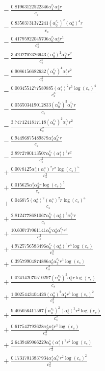 \documentclass[10pt]{article}
\begin{document}
\begin{align*}
&{}  - \frac{0.81963122522346 \alpha_{1}^{c_s} \alpha_{3}^s r}{c_{s}} \\
&{}  - \frac{0.83503731372241 \left(\alpha_{0}^{c_s}\right)^{2} \left(\alpha_{0}^s\right)^{4} r}{c_{s}} \\
&{}  - \frac{0.41795922045706 \alpha_{0}^{c_s} \alpha_{0}^s r^{5}}{c_{s}^{5}} \\
&{}  - \frac{3.4202702326943 \left(\alpha_{0}^s\right)^{2} \alpha_{2}^{c_s} r^{2}}{c_{s}^{2}} \\
&{}  - \frac{6.9086156682632 \left(\alpha_{0}^{c_s}\right)^{4} \alpha_{0}^s r^{2}}{c_{s}^{2}} \\
&{}  - \frac{0.0034551277589885 \left(\alpha_{1}^s\right)^{2} r^{3} \log{\left(c_{s} \right)}^{4}}{c_{s}^{3}} \\
&{}  - \frac{0.056503419012833 \left(\alpha_{0}^{c_s}\right)^{3} \alpha_{2}^{c_s} r}{c_{s}} \\
&{}  - \frac{3.7471241817118 \left(\alpha_{0}^{c_s}\right)^{2} \alpha_{2}^{c_s} r^{2}}{c_{s}^{2}} \\
&{}  - \frac{0.94496875489879 \alpha_{1}^s \alpha_{3}^{c_s} r}{c_{s}} \\
&{}  - \frac{3.8972700113507 \alpha_{0}^{c_s} \left(\alpha_{1}^s\right)^{2} r^{2}}{c_{s}^{2}} \\
&{}  + \frac{0.0078125 \alpha_{0}^s \left(\alpha_{1}^s\right)^{2} r^{2} \log{\left(c_{s} \right)}^{5}}{c_{s}^{2}} \\
&{}  + \frac{0.015625 \alpha_{1}^s \alpha_{3}^s r \log{\left(c_{s} \right)}^{5}}{c_{s}} \\
&{}  + \frac{0.046875 \left(\alpha_{0}^s\right)^{2} \left(\alpha_{1}^s\right)^{2} r \log{\left(c_{s} \right)}^{5}}{c_{s}} \\
&{}  + \frac{2.8124778681067 \alpha_{0}^{c_s} \left(\alpha_{0}^s\right)^{3} \alpha_{1}^{c_s} r}{c_{s}} \\
&{}  + \frac{10.600737061141 \alpha_{0}^{c_s} \alpha_{0}^s \alpha_{1}^{c_s} r^{3}}{c_{s}^{3}} \\
&{}  + \frac{4.9725756583496 \alpha_{0}^{c_s} \left(\alpha_{0}^s\right)^{3} r^{3} \log{\left(c_{s} \right)}}{c_{s}^{3}} \\
&{}  + \frac{0.39579904874886 \alpha_{0}^s \alpha_{2}^{c_s} r^{3} \log{\left(c_{s} \right)}}{c_{s}^{3}} \\
&{}  + \frac{0.024142070510297 \left(\alpha_{0}^{c_s}\right)^{5} \alpha_{0}^s r \log{\left(c_{s} \right)}}{c_{s}} \\
&{}  + \frac{1.0025443404426 \left(\alpha_{0}^s\right)^{2} \alpha_{1}^s r^{3} \log{\left(c_{s} \right)}^{2}}{c_{s}^{3}} \\
&{}  + \frac{9.405056411597 \left(\alpha_{0}^{c_s}\right)^{2} \left(\alpha_{0}^s\right)^{3} r^{2} \log{\left(c_{s} \right)}}{c_{s}^{2}} \\
&{}  + \frac{0.617542792628 \alpha_{0}^s \alpha_{2}^s r^{3} \log{\left(c_{s} \right)}}{c_{s}^{3}} \\
&{}  + \frac{2.6439469066229 \alpha_{0}^s \left(\alpha_{1}^s\right)^{2} r^{2} \log{\left(c_{s} \right)}}{c_{s}^{2}} \\
&{}  + \frac{0.17317013837934 \alpha_{1}^s \alpha_{2}^{c_s} r^{2} \log{\left(c_{s} \right)}^{2}}{c_{s}^{2}}
\end{align*}
\end{document}
